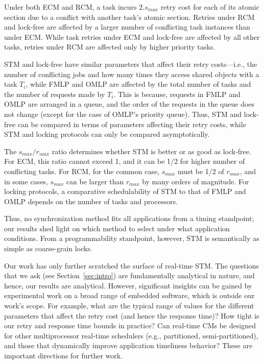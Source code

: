 \documentclass{sig-alternate}
\begin{document}
Under both ECM and RCM,  
a task incurs $2.s_{max}$ retry cost for each of its atomic section due to a conflict with another task's atomic section. Retries under RCM and lock-free are affected by a larger number of conflicting task instances than under ECM. While task retries under ECM and lock-free are affected by all other tasks, retries under RCM are affected only by higher priority tasks. 


STM and lock-free have similar parameters that affect their retry costs---i.e., the number of conflicting jobs and how many times they access shared objects with a task $T_i$, while FMLP and OMLP are affected by the total number of tasks and the number of requests made by $T_i$. This is because, requests in FMLP and OMLP are arranged in a queue, and the order of the requests in the queue does not change (except for the case of OMLP's priority queue). Thus, STM and lock-free can be compared in terms of parameters affecting their retry costs, while STM and locking protocols can only be compared asymptotically. 


The $s_{max}/r_{max}$ ratio determines whether STM is better or as good as lock-free.   
For ECM, this ratio cannot exceed 1, and it can be 1/2 for higher number of conflicting tasks. For RCM, for the common case, $s_{max}$ must be 1/2 of $r_{max}$, and in some cases, $s_{max}$ can be larger than $r_{max}$ by many orders of magnitude. For locking protocols, a comparative schedulability of STM to that of FMLP and OMLP depends on the number of tasks and processors.

Thus, no synchronization method fits all applications from a timing standpoint; our results shed light on which method to select under what application conditions. From a programmability standpoint, however, STM is semantically as simple as coarse-grain locks.

Our work has only further scratched the surface of real-time STM. The questions that we ask (see Section~\ref{sec:intro}) are fundamentally analytical in nature, and hence, our results are analytical. However, significant insights can be gained by experimental work on a broad range of embedded software, which is outside our work's scope. For example, what are the typical range of values for the different parameters that affect the retry cost (and hence the response time)? How tight is our retry and response time bounds in practice? Can real-time CMs be designed for other multiprocessor real-time schedulers (e.g., partitioned, semi-partitioned), and those that dynamically improve application timeliness behavior? These are important directions for further work. 




\end{document}
